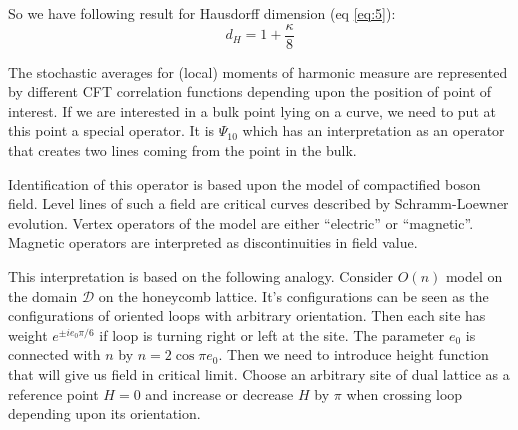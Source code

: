 \documentclass[12pt]{article}
\begin{document}
So we have following result for Hausdorff dimension (eq \eqref{eq:5}):
\begin{equation}
  \label{eq:125}
  d_{H}=1+\frac{\kappa}{8}
\end{equation}



The stochastic averages for (local) moments of harmonic measure are represented by different CFT
correlation functions depending upon the position of point of interest. If we are interested in a
bulk point lying on a curve, we need to put at this point a special operator. It is $\Psi_{10}$
which has an interpretation as an operator that creates two lines coming from the point in the bulk.

Identification of this operator is based upon the model of compactified boson field. Level lines of
such a field are critical curves described by Schramm-Loewner evolution. Vertex operators of the
model are either ``electric'' or ``magnetic''. Magnetic operators are interpreted as discontinuities
in field value. 

This interpretation is based on the following analogy. Consider $O(n)$ model on the domain
$\mathcal{D}$ on the honeycomb lattice. It's configurations can be seen as the configurations of
oriented loops with arbitrary orientation. Then each site has weight $e^{\pm i e_{0}\pi/6}$ if loop
is turning right or left at the site. The parameter $e_{0}$ is connected with $n$ by $n=2\cos \pi
e_{0}$. Then we need to introduce height function that will give us field in critical limit. Choose
an arbitrary site of dual lattice as a reference point $H=0$ and increase or decrease $H$ by $\pi$
when crossing loop depending upon its orientation.
\end{document}
